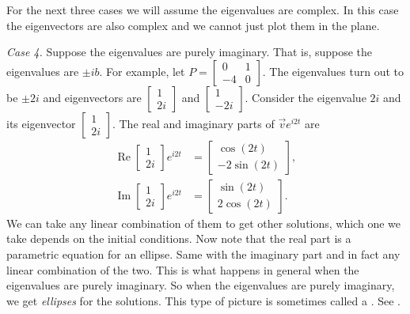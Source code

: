 \documentclass[12pt]{book}
\begin{document}
\medskip

For the next three cases we will assume the eigenvalues are complex.  In this
case the eigenvectors are also complex and we cannot just plot them in the
plane.

\medskip

\emph{Case 4.} Suppose the eigenvalues are purely imaginary.
That is, suppose the eigenvalues are $\pm ib$.  For example,
let $P = 
\left[ \begin{smallmatrix} 0 & 1 \\ -4 & 0 \end{smallmatrix} \right]$.
The eigenvalues turn out to be $\pm 2i$ and eigenvectors are
$\left[ \begin{smallmatrix} 1 \\ 2i \end{smallmatrix} \right]$ and
$\left[ \begin{smallmatrix} 1 \\ -2i \end{smallmatrix} \right]$.  Consider
the eigenvalue $2i$ and its eigenvector
$\left[ \begin{smallmatrix} 1 \\ 2i \end{smallmatrix} \right]$.
The real and imaginary
parts of $\vec{v} e^{i2t}$ are
\begin{align*}
\operatorname{Re}
\begin{bmatrix} 1 \\ 2i \end{bmatrix} e^{i2t} & =
\begin{bmatrix} \cos (2t) \\ -2 \sin (2t)  \end{bmatrix} ,
\\
\operatorname{Im}
\begin{bmatrix} 1 \\ 2i \end{bmatrix} e^{i2t} & =
\begin{bmatrix} \sin (2t) \\ 2 \cos (2t) \end{bmatrix} .
\end{align*}
We can take any linear combination of them to get other solutions,
which one we take
depends on the initial
conditions.  Now note that the real part is
a parametric equation for an ellipse.  Same with the imaginary part
and in fact any linear combination of the two.
This is what happens in general when the eigenvalues are purely imaginary.
So when the eigenvalues are purely imaginary, we get
\emph{ellipses} for the
solutions.  This type of picture is sometimes called a
\emph{}.  See .
\end{document}
